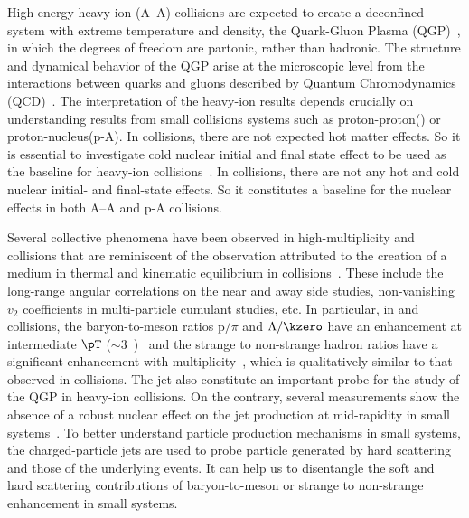 \documentclass[ALICE,manyauthors]{cernphprep}
\begin{document}
High-energy heavy-ion (A--A) collisions are expected to create a deconfined system with extreme temperature and density, the Quark-Gluon Plasma (QGP)~\cite{Rafelski:126179, Satz:2000bn, Shuryak:1983ni, Jacak:2012dx, Cleymans:1985wb, Bass:1998vz, BraunMunzinger:2007zz}, in which the degrees of freedom are partonic, rather than hadronic.
The structure and dynamical behavior of the QGP arise at the microscopic level from the interactions between quarks and gluons described by Quantum Chromodynamics (QCD)~\cite{Laermann:2003cv, Gupta:2011wh, Bhattacharya:2014ara}.
The interpretation of the heavy-ion results depends crucially on understanding results from small collisions systems such as proton-proton(\pp) or proton-nucleus(p-A).
In \pPb collisions, there are not expected hot matter effects.
So it is essential to investigate cold nuclear initial and final state effect to be used as the baseline for heavy-ion collisions~\cite{Salgado:2011wc, Eskola:2016oht}.
In \pp collisions, there are not any hot and cold nuclear initial- and final-state effects.
So it constitutes a baseline for the nuclear effects in both A--A and p-A collisions.

Several collective phenomena have been observed in high-multiplicity \pp and \pPb collisions that are reminiscent of the observation attributed to the creation of a medium in thermal and kinematic equilibrium in \PbPb collisions~\cite{Acharya:2019vdf, Aad:2015gqa, Abelev:2012ola, ABELEV:2013wsa, Khachatryan:2015waa, Abelev:2014uua, Adam:2015vsf}.
These include the long-range angular correlations on the near and away side studies, non-vanishing $v_{2}$ coefficients in multi-particle cumulant studies, etc.
In particular, in \pp and \pPb collisions, the baryon-to-meson ratios p$/\pi$ and $\Lambda/\kzero$ have an enhancement at intermediate $\pT$ ($\sim 3$~\GeVc)~\cite{Acharya:2018orn, Khachatryan:2016yru, Abelev:2013xaa, ALICE:2017jyt} and the strange to non-strange hadron ratios have a significant enhancement with multiplicity~\cite{Abelev:2013haa, ALICE:2017jyt, Khachatryan:2016yru}, which is qualitatively similar to that observed in \PbPb collisions.
The jet also constitute an important probe for the study of the QGP in heavy-ion collisions. 
On the contrary, several measurements show the absence of a robust nuclear effect on the jet production at mid-rapidity in small systems~\cite{Acharya:2019jyg, Acharya:2019tku, ALICE:2014dla, Abelev:2013fn, Acharya:2018eat, Acharya:2017okq, Adam:2015xea, Adam:2016jfp}.
To better understand particle production mechanisms in small systems, the charged-particle jets are used to probe particle generated by hard scattering and those of the underlying events.
It can help us to disentangle the soft and hard scattering contributions of baryon-to-meson or strange to non-strange enhancement in small systems. 
\end{document}
